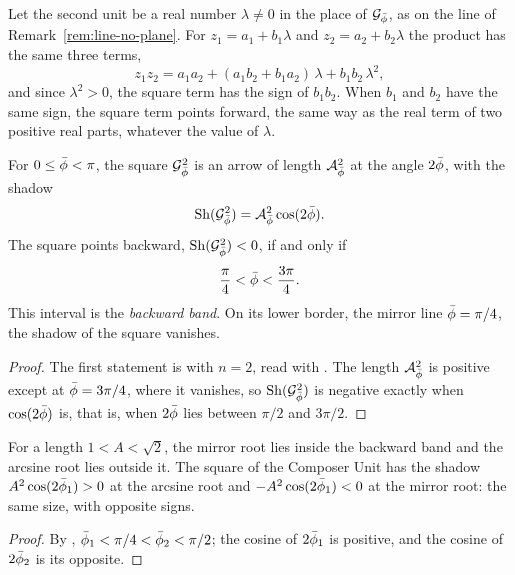 \begin{remark}\label{rem:line-forward}
Let the second unit be a real number $\lambda \neq 0$ in the place of $\mathcal{G}_{\bar{\phi}}$, as on the line of Remark~\ref{rem:line-no-plane}. For $z_1 = a_1 + b_1\lambda$ and $z_2 = a_2 + b_2\lambda$ the product has the same three terms,
\[
z_1 z_2 = a_1 a_2 + (a_1 b_2 + b_1 a_2)\,\lambda + b_1 b_2\,\lambda^2 ,
\]
and since $\lambda^2 > 0$, the square term has the sign of $b_1 b_2$. When $b_1$ and $b_2$ have the same sign, the square term points forward, the same way as the real term of two positive real parts, whatever the value of $\lambda$.
\end{remark}

\begin{theorem}\label{thm:square-band}
For $0 \le \bar{\phi} < \pi$, the square $\mathcal{G}_{\bar{\phi}}^2$ is an arrow of length $\mathcal{A}_{\bar{\phi}}^2$ at the angle $2\bar{\phi}$, with the shadow
\[
\operatorname{Sh}(\mathcal{G}_{\bar{\phi}}^2) = \mathcal{A}_{\bar{\phi}}^2\cos(2\bar{\phi}).
\]
The square points backward, $\operatorname{Sh}(\mathcal{G}_{\bar{\phi}}^2) < 0$, if and only if
\[
\frac{\pi}{4} < \bar{\phi} < \frac{3\pi}{4} .
\]
This interval is the \emph{backward band}. On its lower border, the mirror line $\bar{\phi} = \pi/4$, the shadow of the square vanishes.
\end{theorem}

\begin{proof}
The first statement is  with $n = 2$, read with . The length $\mathcal{A}_{\bar{\phi}}^2$ is positive except at $\bar{\phi} = 3\pi/4$, where it vanishes, so $\operatorname{Sh}(\mathcal{G}_{\bar{\phi}}^2)$ is negative exactly when $\cos(2\bar{\phi})$ is, that is, when $2\bar{\phi}$ lies between $\pi/2$ and $3\pi/2$.
\end{proof}

\begin{corollary}\label{cor:roots-band}
For a length $1 < A < \sqrt{2}$, the mirror root lies inside the backward band and the arcsine root lies outside it. The square of the Composer Unit has the shadow $A^2\cos(2\bar{\phi}_1) > 0$ at the arcsine root and $-A^2\cos(2\bar{\phi}_1) < 0$ at the mirror root: the same size, with opposite signs.
\end{corollary}

\begin{proof}
By , $\bar{\phi}_1 < \pi/4 < \bar{\phi}_2 < \pi/2$; the cosine of $2\bar{\phi}_1$ is positive, and the cosine of $2\bar{\phi}_2$ is its opposite.
\end{proof}

